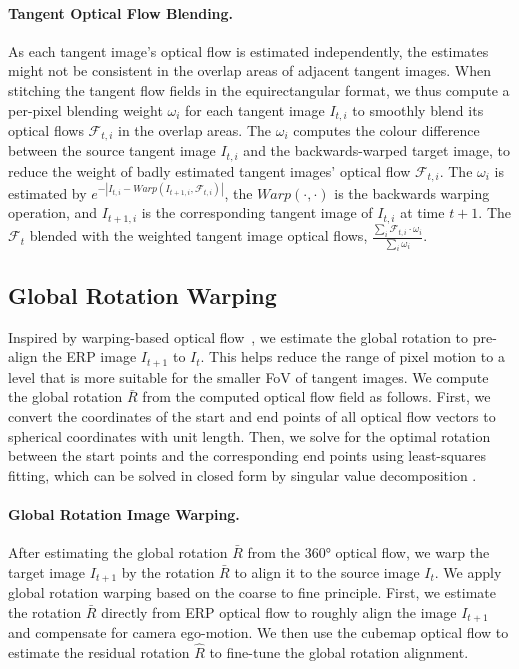 \paragraph{Tangent Optical Flow Blending.}
As each tangent image's optical flow is estimated independently, the estimates might not be consistent in the overlap areas of adjacent tangent images.
When stitching the tangent flow fields in the equirectangular format, we thus compute a per-pixel blending weight $\omega_{i}$ for each tangent image $I_{t,i}$ to smoothly blend its optical flows $\mathcal{F}_{t,i}$ in the overlap areas.
The $\omega_{i}$ computes the colour difference between the source tangent image $I_{t,i}$ and the backwards-warped target image, to reduce the weight of badly estimated tangent images' optical flow $\mathcal{F}_{t,i}$.
The $\omega_i$ is estimated by 
$e^{-| I_{t,i} - Warp(I_{t+1,i}, \mathcal{F}_{t,i})|}$, the $Warp(\cdot , \cdot)$ is the backwards warping operation, and $I_{t+1,i}$ is the corresponding tangent image of $I_{t,i}$ at time ${t+1}$.
The $\mathcal{F}_t$ blended with the weighted tangent image optical flows,  $\frac{\sum_i{\mathcal{F}_{t,i} \cdot \omega_{i}}}{\sum_i{\omega_i}}$.




\subsection{Global Rotation Warping}
\label{sec:approach:warping}

Inspired by warping-based optical flow~\cite{BroxBPW2004}, we estimate the global rotation to pre-align the ERP image $I_{t+1}$ to $I_{t}$.
This helps reduce the range of pixel motion to a level that is more suitable for the smaller FoV of tangent images.
We compute the global rotation $\bar{R}$ from the computed optical flow field as follows.
First, we convert the coordinates of the start and end points of all optical flow vectors to spherical coordinates with unit length.
Then, we solve for the optimal rotation between the start points and the corresponding end points using least-squares fitting, which can be solved in closed form by singular value decomposition \cite{ArunHB1987,SorkiR2017}.

\vspace{-1em}
\paragraph{Global Rotation Image Warping.}
After estimating the global rotation $\bar{R}$ from the 360° optical flow, we warp the target image $I_{t+1}$ by the rotation $\bar{R}$ to align it to the source image $I_{t}$. %
We apply global rotation warping based on the coarse to fine principle.
First, we estimate the rotation $\bar{R}$ directly from ERP optical flow to roughly align the image $I_{t+1}$ and compensate for camera ego-motion.
We then use the cubemap optical flow to estimate the residual rotation $\hat{R}$ to fine-tune the global rotation alignment.

